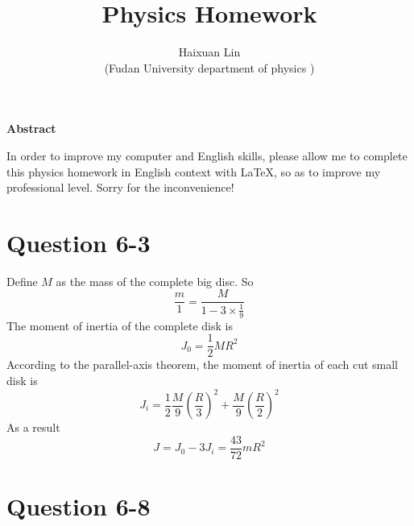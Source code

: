 \documentclass[12pt,a4paper]{article}%
\title{\fontsize{18pt}{27pt}\selectfont%
	{\heiti%
		Physics Homework}}%
\author{\fontsize{12pt}{18pt}\selectfont%
	{\fangsong%
		Haixuan Lin}\\%
	\fontsize{10.5pt}{15.75pt}\selectfont%
	{\fangsong%
		(Fudan University department of physics
		)}}%
\date{}%
\begin{document}
	\maketitle%
	\lhead{}%
	\chead{}%
	\rhead{}%
	\lfoot{}%
	\cfoot{\thepage}%
	\rfoot{}%
	
	
		\begin{center}%
			{\textbf{Abstract}}%
		\end{center}
		\begin{adjustwidth}{1.06cm}{1.06cm}%
			\hspace{1.5em}In order to improve my computer and English skills, please allow me to complete this physics homework in English context with \LaTeX, so as to improve my professional level. Sorry for the inconvenience!
		\end{adjustwidth}
	
	
	
	\newpage%
	
	
	
	\section{Question 6-3}
	\noindent Define $M$ as the mass of the complete big disc. So
	\begin{equation}
		\frac{m}{1}=\frac{M}{1-3\times\frac{1}{9}}
	\end{equation}
	The moment of inertia of the complete disk is
	\begin{equation}
		J_0=\frac{1}{2}MR^2
	\end{equation}
	According to the parallel-axis theorem, the moment of inertia of each cut small disk is
	\begin{equation}
		J_i=\frac{1}{2}\frac{M}{9}\left(\frac{R}{3}\right)^2+\frac{M}{9}\left(\frac{R}{2}\right)^2
	\end{equation}
	As a result
	$$
	J=J_0-3J_i=\frac{43}{72}mR^2
	$$
	
	\section{Question 6-8}
\end{document}
